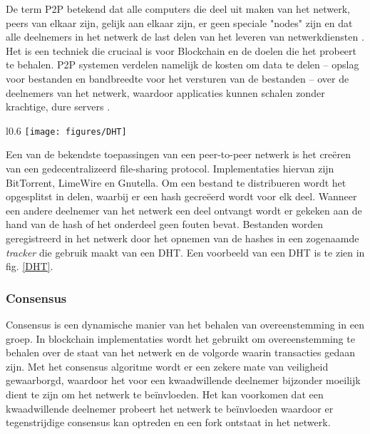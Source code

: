 De term \acrshort{P2P} betekend dat alle computers die deel uit maken van het netwerk, peers van elkaar zijn, gelijk aan elkaar zijn, er geen speciale "nodes" zijn en dat alle deelnemers in het netwerk de last delen van het leveren van netwerkdiensten \citep[~p.171]{Antonopoulos:2014:MBU:2695500}. Het is een techniek die cruciaal is voor Blockchain en de doelen die het probeert te behalen. \acrshort{P2P} systemen verdelen namelijk de kosten om data te delen – opslag voor bestanden en bandbreedte voor het versturen van de bestanden – over de deelnemers van het netwerk, waardoor applicaties kunnen schalen zonder krachtige, dure servers \citep{bawa2003peer}.

\clearpage

\begin{wrapfigure}[11]{l}{0.6\textwidth}
  \texttt{[image: figures/DHT]}
  \caption[Distributed Hash Table] {
    Door het vertalen van data naar een cryptografische sleutel is het mogelijk om aan de hand van de sleutel de data op te vragen aan peers die de data bezitten.
  }
  \label{DHT}
\end{wrapfigure}

Een van de bekendste toepassingen van een peer-to-peer netwerk is het creëren van een gedecentralizeerd file-sharing protocol. Implementaties hiervan zijn BitTorrent, LimeWire en Gnutella. Om een bestand te distribueren wordt het opgesplitst in delen, waarbij er een hash gecreëerd wordt voor elk deel. Wanneer een andere deelnemer van het netwerk een deel ontvangt wordt er gekeken aan de hand van de hash of het onderdeel geen fouten bevat. Bestanden worden geregistreerd in het netwerk door het opnemen van de hashes in een zogenaamde \textit{tracker} die gebruik maakt van een \acrfull{DHT}. Een voorbeeld van een DHT is te zien in fig. \ref{DHT}.

\subsubsection{Consensus}

Consensus is een dynamische manier van het behalen van overeenstemming in een groep. In blockchain implementaties wordt het gebruikt om overeenstemming te behalen over de staat van het netwerk en de volgorde waarin transacties gedaan zijn. Met het consensus algoritme wordt er een zekere mate van veiligheid gewaarborgd, waardoor het voor een kwaadwillende deelnemer bijzonder moeilijk dient te zijn om het netwerk te beïnvloeden. Het kan voorkomen dat een kwaadwillende deelnemer probeert het netwerk te beïnvloeden waardoor er tegenstrijdige consensus kan optreden en een \gls{fork} ontstaat in het netwerk.

